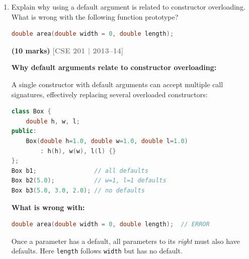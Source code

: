 \documentclass[12pt,a3paper]{article}
\newcommand{\yr}[1]{\hfill\textcolor{gray}{\small\textbf{[#1]}}}
\newcommand{\mk}[1]{\textcolor{orange!70!black}{\small\textbf{(#1 marks)}}}
\begin{document}
\begin{enumerate}
\begin{tcolorbox}[enhanced,breakable,ansbox,colback=cC!4,colframe=cC,
  boxrule=0.8pt,arc=5pt,
  title={\textbf{Answer --- Reference --- 3 scenarios, dot vs arrow}},
  fonttitle=\bfseries\color{white},colbacktitle=cC]
\medskip
\textbf{Why dot (\texttt{.}) not arrow (\texttt{->}):}

\texttt{->} is used with \emph{pointers} because a pointer holds an
address and must be dereferenced.  A \emph{reference} is an alias
that the compiler automatically dereferences; it behaves exactly
like the original variable, so \texttt{.} is used directly:

\begin{lstlisting}[language=C++]
struct Point { int x, y; };
Point p = {1, 2};
Point* ptr = &p;
Point& ref = p;

ptr->x = 10;   // pointer: must dereference with ->
ref.x  = 10;   // reference: same as p.x, use .
\end{lstlisting}

\end{tcolorbox}


\item Explain why using a default argument is related to constructor overloading. What is wrong with the following function prototype?
\begin{lstlisting}[language=C++]
double area(double width = 0, double length);
\end{lstlisting}
\mk{10}
\yr{CSE 201 | 2013--14}

\begin{tcolorbox}[enhanced,breakable,ansbox,colback=cC!4,colframe=cC,
  boxrule=0.8pt,arc=5pt,
  title={\textbf{Answer --- Default argument and constructor overloading; wrong prototype}},
  fonttitle=\bfseries\color{white},colbacktitle=cC]

\textbf{Why default arguments relate to constructor overloading:}

A single constructor with default arguments can accept multiple call
signatures, effectively replacing several overloaded constructors:

\begin{lstlisting}[language=C++]
class Box {
    double h, w, l;
public:
    Box(double h=1.0, double w=1.0, double l=1.0)
        : h(h), w(w), l(l) {}
};
Box b1;                // all defaults
Box b2(5.0);           // w=1, l=1 defaults
Box b3(5.0, 3.0, 2.0); // no defaults
\end{lstlisting}

\textbf{What is wrong with:}
\begin{lstlisting}[language=C++]
double area(double width = 0, double length);  // ERROR
\end{lstlisting}
Once a parameter has a default, all parameters to its \emph{right}
must also have defaults.  Here \texttt{length} follows
\texttt{width} but has no default.


\end{tcolorbox}
\end{enumerate}
\end{document}
